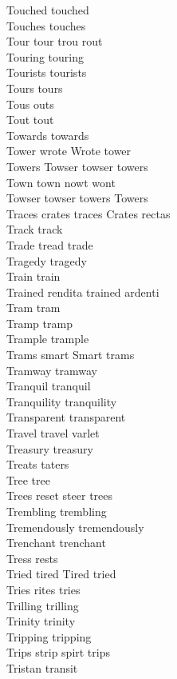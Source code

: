 Touched touched\\
Touches touches\\
Tour tour trou rout\\
Touring touring\\
Tourists tourists\\
Tours tours\\
Tous outs\\
Tout tout\\
Towards towards\\
Tower wrote Wrote tower\\
Towers Towser towser towers\\
Town town nowt wont\\
Towser towser towers Towers\\
Traces crates traces Crates rectas\\
Track track\\
Trade tread trade\\
Tragedy tragedy\\
Train train\\
Trained rendita trained ardenti\\
Tram tram\\
Tramp tramp\\
Trample trample\\
Trams smart Smart trams\\
Tramway tramway\\
Tranquil tranquil\\
Tranquility tranquility\\
Transparent transparent\\
Travel travel varlet\\
Treasury treasury\\
Treats taters\\
Tree tree\\
Trees reset steer trees\\
Trembling trembling\\
Tremendously tremendously\\
Trenchant trenchant\\
Tress rests\\
Tried tired Tired tried\\
Tries rites tries\\
Trilling trilling\\
Trinity trinity\\
Tripping tripping\\
Trips strip spirt trips\\
Tristan transit\\
